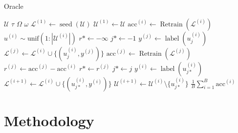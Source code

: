 \documentclass[]{article}
\begin{document}
\begin{algorithm}
	\caption{Oracle}\label{alg:oracle}
	\begin{algorithmic}[1]
		\Require $\mathcal{U}$ 
		\Require $\tau$ 
		\Require $\Omega$ 
		\Require $\omega$ 
		\State $\mathcal{L}^{(1)} \gets \operatorname{seed}(\mathcal{U})$  
		\State $\mathcal{U}^{(1)} \gets \mathcal{U}$
			\State $\text{acc}^{(i)} \gets \operatorname{Retrain}(\mathcal{L}^{(i)})$  
			\State $u^{(i)} \sim \text{unif}(1:|\mathcal{U}^{(i)}|)$
			\State $r* \gets -\infty$
			\State $j* \gets -1$
			 
				\State $y^{(j)} \gets \operatorname{label}(u^{(i)}_{j})$
				\State $\mathcal{L}^{(j)} \gets \mathcal{L}^{(i)} \cup \{(u^{(i)}_j, y^{(j)})\}$
				\State $\text{acc}^{(j)} \gets \operatorname{Retrain}(\mathcal{L}^{(j)})$  
				\State $r^{(j)} \gets \text{acc}^{(j)} - \text{acc}^{(i)}$
				 
					\State $r* \gets r^{(j)}$
					\State $j* \gets j$
				\EndIf  
			\EndFor
			\State $y^{(i)} \gets \operatorname{label}(u^{(i)}_{j*})$
			\State $\mathcal{L}^{(i+1)} \gets \mathcal{L}^{(i)} \cup \{(u^{(i)}_{j*}, y^{(i)})\}$
			\State $\mathcal{U}^{(i+1)} \gets \mathcal{U}^{(i)} \setminus \{u^{(i)}_{j*}\}$
		\EndFor
		\State
		\Return $\frac{1}{B} \sum_{i=1}^{B} \text{acc}^{(i)}$
	\end{algorithmic}
\end{algorithm}

\section{Methodology}

\end{document}

